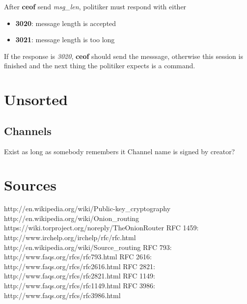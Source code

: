 \documentclass[12pt,a4paper]{book}
\begin{document}
After \textbf{ceof} send \textit{msg\_len}, politiker must respond with
either
\begin{itemize}
\item \textbf{3020}: message length is accepted
\item \textbf{3021}: message length is too long
\end{itemize}

If the response is \textit{3020}, \textbf{ceof} should send the messsage,
otherwise this session is finished and the next thing the politiker expects
is a command.

\chapter{Unsorted}
\section{Channels}
Exist as long as somebody remembers it
Channel name is signed by creator?
\appendix
\chapter{Sources}
\begin{thebibliography}{42}
 http://en.wikipedia.org/wiki/Public-key\_cryptography
 http://en.wikipedia.org/wiki/Onion\_routing
 https://wiki.torproject.org/noreply/TheOnionRouter
 RFC 1459: http://www.irchelp.org/irchelp/rfc/rfc.html
 http://en.wikipedia.org/wiki/Source\_routing
 RFC 793: http://www.faqs.org/rfcs/rfc793.html
 RFC 2616: http://www.faqs.org/rfcs/rfc2616.html
 RFC 2821: http://www.faqs.org/rfcs/rfc2821.html
 RFC 1149: http://www.faqs.org/rfcs/rfc1149.html
 RFC 3986: http://www.faqs.org/rfcs/rfc3986.html
\end{thebibliography}
\end{document}
